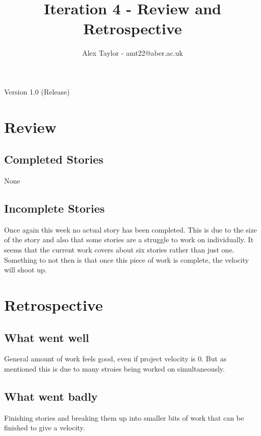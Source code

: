 \documentclass{article}
\title{Iteration 4 - Review and Retrospective}
\author{Alex Taylor - amt22@aber.ac.uk}
\begin{document}
\maketitle
\begin{center}
	Version 1.0 (Release)
\end{center}
\tableofcontents
\thispagestyle{empty}
\newpage

\section{Review}
\subsection{Completed Stories}
None
\subsection{Incomplete Stories}
Once again this week no actual story has been completed. This is due to the size of the story and also that some stories are a struggle to work on individually. It seems that the current work covers about six stories rather than just one. Something to not then is that once this piece of work is complete, the velocity will shoot up.
\newpage

\section{Retrospective}
\subsection{What went well}
General amount of work feels good, even if project velocity is 0. But as mentioned this is due to many stroies being worked on simultaneously.
\subsection{What went badly}
Finishing stories and breaking them up into smaller bits of work that can be finished to give a velocity.
\end{document}
